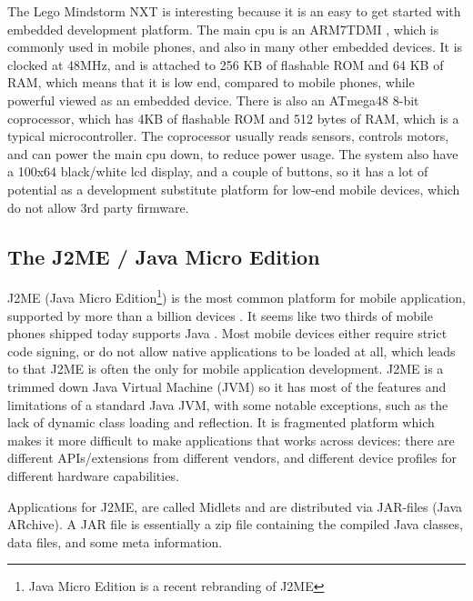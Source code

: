 \documentclass[11pt]{report}
\begin{document}
The Lego Mindstorm NXT is interesting because it is an easy to get started with embedded development platform. 
The main cpu is an ARM7TDMI \cite{arm7tdmi}, which is commonly used in mobile phones, and also in many other embedded devices. 
It is clocked at 48MHz, and is attached to 256 KB of flashable ROM and 64 KB of RAM, which means that it is low end, compared to mobile phones, while powerful viewed as an embedded device.
There is also an ATmega48 \cite{atmega48} 8-bit coprocessor, which has 4KB of flashable ROM and 512 bytes of RAM, which is a typical microcontroller. 
The coprocessor usually reads sensors, controls motors, and can power the main cpu down, to reduce power usage.
The system also have a 100x64 black/white lcd display, and a couple of buttons, so it has a lot of potential as a development substitute platform for low-end mobile devices, which do not allow 3rd party firmware.

\subsection{The J2ME / Java Micro Edition}
J2ME (Java Micro Edition\footnote{Java Micro Edition is a recent rebranding of J2ME}) is the most common platform for mobile application, supported by more than a billion devices \cite{sun-j2me}. 
It seems like two thirds of mobile phones shipped today supports Java \cite{esmertec-globenews}.
Most mobile devices either require strict code signing, or do not allow native applications to be loaded at all, which leads to that J2ME is often the only for mobile application development.
J2ME is a trimmed down Java Virtual Machine (JVM) so it has most of the features and limitations of a standard Java JVM, with some notable exceptions, such as the lack of dynamic class loading and reflection. It is fragmented platform which makes it more difficult to make applications that works across devices: there are different APIs/extensions from different vendors, and different device profiles for different hardware capabilities.

Applications for J2ME, are called Midlets and are distributed via JAR-files (Java ARchive). A JAR file is essentially a zip file containing the compiled Java classes, data files, and some meta information.
\end{document}
